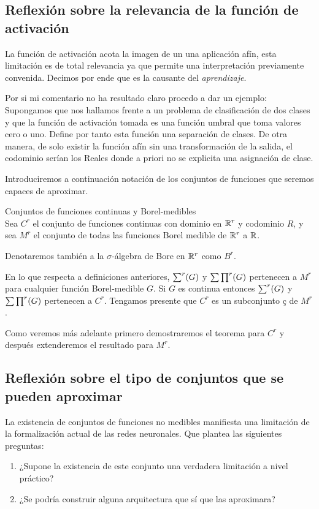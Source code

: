 \subsection{ Reflexión sobre la relevancia de la función de activación}  

La función de activación acota la imagen de un una aplicación afín, esta limitación 
es de total relevancia ya que permite una interpretación previamente convenida. 
Decimos por ende que es la causante del \textit{aprendizaje}.     

Por si mi comentario no ha resultado claro procedo a dar un ejemplo:   
Supongamos que nos hallamos frente a un problema de clasificación de dos clases y que la función de activación
tomada es una función umbral que toma valores cero o uno. Define por tanto esta función una separación de clases. 
De otra manera, de solo existir la función afín sin una transformación de la salida, el codominio serían los Reales
donde a priori no se explicita una asignación de clase.  

Introduciremos a continuación notación de los conjuntos de funciones que seremos capaces de aproximar.  

\begin{definicion} Conjuntos de funciones continuas y Borel-medibles \\
    Sea $C^r$ el conjunto de funciones continuas con dominio en $\mathbb{R}^r$ y codominio $R$, 
    y sea $M^r$ el conjunto de todas las funciones Borel medible de $\mathbb{R}^r$ a $\mathbb{R}$. 

    Denotaremos también a la $\sigma$-álgebra de Bore en $\mathbb{R} ^r$ como $B^r$. 
\end{definicion}

En lo que respecta a definiciones anteriores, $\sum ^r (G)$ y $\sum \prod^r (G)$ pertenecen a 
$M^r$ para cualquier función Borel-medible $G$. Si $G$ es continua entonces 
$\sum ^r (G)$ y $\sum \prod^r (G)$ pertenecen a $C^r$. Tengamos presente que $C^r$ es un subconjunto ç
de $M^r$.  

Como veremos más adelante primero demostraremos el teorema para $C^r$ y después 
extenderemos el resultado para $M^r$.   


\subsection{ Reflexión sobre el tipo de conjuntos que se pueden aproximar}

La existencia de conjuntos de funciones no medibles manifiesta una limitación
de la formalización actual de las redes neuronales. Que plantea las siguientes 
preguntas: 
\begin{enumerate}
    \item ¿Supone la existencia de este conjunto una verdadera limitación a nivel práctico?
    \item ¿Se podría construir alguna arquitectura que sí que las aproximara?
\end{enumerate}  

